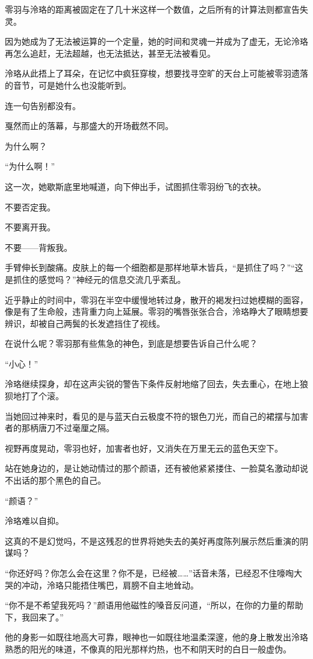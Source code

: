\documentclass[UTF8, scheme = chinese, openany]{ctexbook}
\begin{document}
零羽与泠珞的距离被固定在了几十米这样一个数值，之后所有的计算法则都宣告失灵。

因为她成为了无法被运算的一个定量，她的时间和灵魂一并成为了虚无，无论泠珞再怎么追赶，无法超越，也无法抵达，甚至无法被看见。

泠珞从此捂上了耳朵，在记忆中疯狂穿梭，想要找寻空旷的天台上可能被零羽遗落的音节，可是她什么也没能听到。

连一句告别都没有。

戛然而止的落幕，与那盛大的开场截然不同。

为什么啊？

“为什么啊！”

这一次，她歇斯底里地喊道，向下伸出手，试图抓住零羽纷飞的衣袂。

不要否定我。

不要离开我。

不要——背叛我。

手臂伸长到酸痛。皮肤上的每一个细胞都是那样地草木皆兵，“是抓住了吗？”“这是抓住的感觉吗？”神经元的信息交流几乎紊乱。

近乎静止的时间中，零羽在半空中缓慢地转过身，散开的褐发扫过她模糊的面容，像是有了生命般，违背重力向上延展。零羽的嘴唇张张合合，泠珞睁大了眼睛想要辨识，却被自己两鬓的长发遮挡住了视线。

在说什么呢？零羽那有些焦急的神色，到底是想要告诉自己什么呢？

“小心！”

泠珞继续探身，却在这声尖锐的警告下条件反射地缩了回去，失去重心，在地上狼狈地打了个滚。

当她回过神来时，看见的是与蓝天白云极度不符的银色刀光，而自己的裙摆与加害者的那柄唐刀不过毫厘之隔。

视野再度晃动，零羽也好，加害者也好，又消失在万里无云的蓝色天空下。

站在她身边的，是让她动情过的那个颜语，还有被他紧紧搂住、一脸莫名激动却说不出话的那个黑色的自己。

“颜语？”

泠珞难以自抑。

这真的不是幻觉吗，不是这残忍的世界将她失去的美好再度陈列展示然后重演的阴谋吗？

“你还好吗？你怎么会在这里？你不是，已经被……”话音未落，已经忍不住嚎啕大哭的冲动，泠珞只能捂住嘴巴，肩膀不自主地耸动。

“你不是不希望我死吗？”颜语用他磁性的嗓音反问道，“所以，在你的力量的帮助下，我回来了。”

他的身影一如既往地高大可靠，眼神也一如既往地温柔深邃，他的身上散发出泠珞熟悉的阳光的味道，不像真的阳光那样灼热，也不和阴天时的白日一般虚伪。
\end{document}

